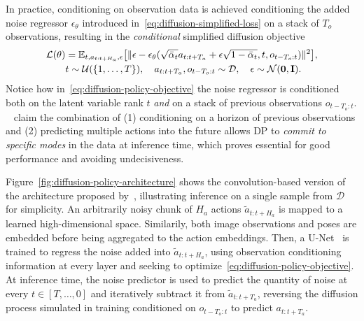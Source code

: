 In practice, conditioning on observation data is achieved conditioning the added noise regressor \( \epsilon_\theta \) introduced in~\ref{eq:diffusion-simplified-loss} on a stack of \( T_o \) observations, resulting in the \emph{conditional} simplified diffusion objective
\begin{align}
    \mathcal L(\theta) &= \mathbb{E}_{t, a_{t:t+H_a}, \epsilon} \big[
        \Vert \epsilon - \epsilon_\theta(\sqrt{\bar \alpha_t} a_{t:t+T_a} + \epsilon \sqrt{1 - \bar \alpha_t}, t, o_{t-T_o:t}) \Vert^2 \big], \label{eq:diffusion-policy-objective} \\
        & t \sim \mathcal{U}(\{1,\dots,T\}), \quad
        a_{t:t+T_a}, o_{t-T_o:t} \sim \mathcal{D}, \quad
        \epsilon \sim \mathcal{N}(\mathbf{0},\mathbf{I}). \notag 
\end{align}
Notice how in~\ref{eq:diffusion-policy-objective} the noise regressor is conditioned both on the latent variable rank \( t \) \emph{and} on a stack of previous observations \(o_{t-T_o:t} \).
~\citet{chiDiffusionPolicyVisuomotor2024} claim the combination of (1) conditioning on a horizon of previous observations and (2) predicting multiple actions into the future allows DP to \emph{commit to specific modes} in the data at inference time, which proves essential for good performance and avoiding undecisiveness.

Figure~\ref{fig:diffusion-policy-architecture} shows the convolution-based version of the architecture proposed by~\citet{chiDiffusionPolicyVisuomotor2024}, illustrating inference on a single sample from \( \mathcal D \) for simplicity.
An arbitrarily noisy chunk of \( H_a \) actions \(\tilde a_{t:t+H_a} \) is mapped to a learned high-dimensional space. 
Similarily, both image observations and poses are embedded before being aggregated to the action embeddings.
Then, a U-Net~\citep{ronnebergerUNetConvolutionalNetworks2015} is trained to regress the noise added into \( \tilde a_{t:t+H_a} \), using observation conditioning information at every layer and seeking to optimize~\ref{eq:diffusion-policy-objective}.
At inference time, the noise predictor is used to predict the quantity of noise at every \( t \in [T, \dots, 0 ] \) and iteratively subtract it from \(\tilde a_{t:t+T_a} \), reversing the diffusion process simulated in training conditioned on \(o_{t-T_o:t} \) to predict \(a_{t:t+T_a} \).

